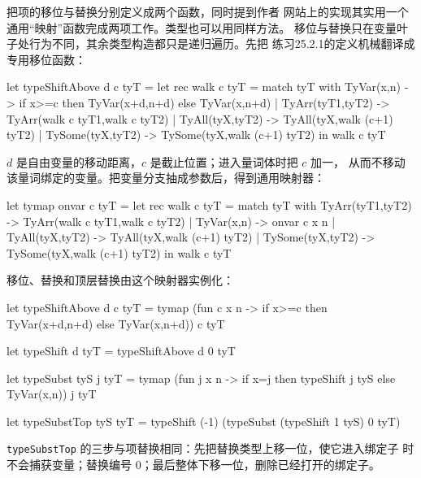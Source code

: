把项的移位与替换分别定义成两个函数，同时提到作者
网站上的实现其实用一个通用“映射”函数完成两项工作。类型也可以用同样方法。
移位与替换只在变量叶子处行为不同，其余类型构造都只是递归遍历。先把
练习25.2.1的定义机械翻译成专用移位函数：
\begin{taplocamlcode}
let typeShiftAbove d c tyT =
  let rec walk c tyT = match tyT with
      TyVar(x,n) ->
        if x>=c then TyVar(x+d,n+d) else TyVar(x,n+d)
    | TyArr(tyT1,tyT2) ->
        TyArr(walk c tyT1,walk c tyT2)
    | TyAll(tyX,tyT2) ->
        TyAll(tyX,walk (c+1) tyT2)
    | TySome(tyX,tyT2) ->
        TySome(tyX,walk (c+1) tyT2)
  in walk c tyT
\end{taplocamlcode}

\(d\) 是自由变量的移动距离，\(c\) 是截止位置；进入量词体时把 \(c\) 加一，
从而不移动该量词绑定的变量。把变量分支抽成参数后，得到通用映射器：
\begin{taplocamlcode}
let tymap onvar c tyT =
  let rec walk c tyT = match tyT with
      TyArr(tyT1,tyT2) ->
        TyArr(walk c tyT1,walk c tyT2)
    | TyVar(x,n) -> onvar c x n
    | TyAll(tyX,tyT2) ->
        TyAll(tyX,walk (c+1) tyT2)
    | TySome(tyX,tyT2) ->
        TySome(tyX,walk (c+1) tyT2)
  in walk c tyT
\end{taplocamlcode}

移位、替换和顶层替换由这个映射器实例化：
\begin{taplocamlcode}
let typeShiftAbove d c tyT =
  tymap
    (fun c x n ->
      if x>=c then TyVar(x+d,n+d) else TyVar(x,n+d))
    c tyT

let typeShift d tyT = typeShiftAbove d 0 tyT
\end{taplocamlcode}

\begin{taplocamlcode}
let typeSubst tyS j tyT =
  tymap
    (fun j x n ->
      if x=j then typeShift j tyS else TyVar(x,n))
    j tyT

let typeSubstTop tyS tyT =
  typeShift (-1) (typeSubst (typeShift 1 tyS) 0 tyT)
\end{taplocamlcode}

\texttt{typeSubstTop} 的三步与项替换相同：先把替换类型上移一位，使它进入绑定子
时不会捕获变量；替换编号 \(0\)；最后整体下移一位，删除已经打开的绑定子。

